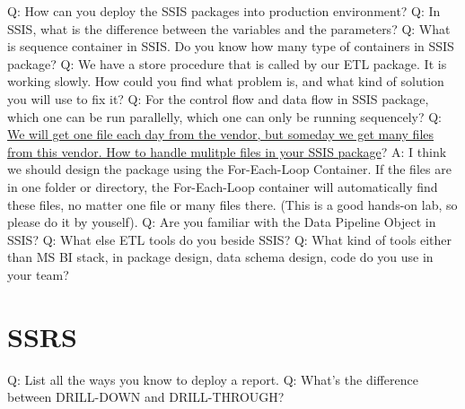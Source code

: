 \documentclass[a4paper,11pt]{article}
\begin{document}
\noindent 
Q: How can you deploy the SSIS packages into production environment? \newline \newline
\noindent 
Q: In SSIS, what is the difference between the variables and the parameters? \newline \newline
\noindent 
Q: What is sequence container in SSIS. Do you know how many type of containers in SSIS package? \newline \newline
\noindent 
Q: We have a store procedure that is called by our ETL package. It is working slowly. How could you find what problem is, and what kind of solution you will use to fix it?\newline \newline
\noindent 
Q: For the control flow and data flow in SSIS package, which one can be run parallelly, which one can only be running sequencely? \newline \newline
\noindent 
Q: \ul{We will get one file each day from the vendor, but someday we get many files from this vendor. How to handle mulitple files in your SSIS package}? \newline 
A: I think we should design the package using the For-Each-Loop Container. If the files are in one folder or directory, the For-Each-Loop container will automatically find these files, no matter one file or many files there. (This is a good hands-on lab, so please do it by youself).\newline\newline
\noindent 
Q: Are you familiar with the Data Pipeline Object in SSIS? \newline \newline
\noindent 
Q: What else ETL tools do you beside SSIS? \newline \newline
\noindent 
Q: What kind of tools either than MS BI stack, in package design, data schema design, code do you use in your team? \newline \newline

\section{SSRS}
Q: List all the ways you know to deploy a report.\newline \newline
\noindent 
Q: What's the difference between DRILL-DOWN and DRILL-THROUGH? \newline \newline
\end{document}
